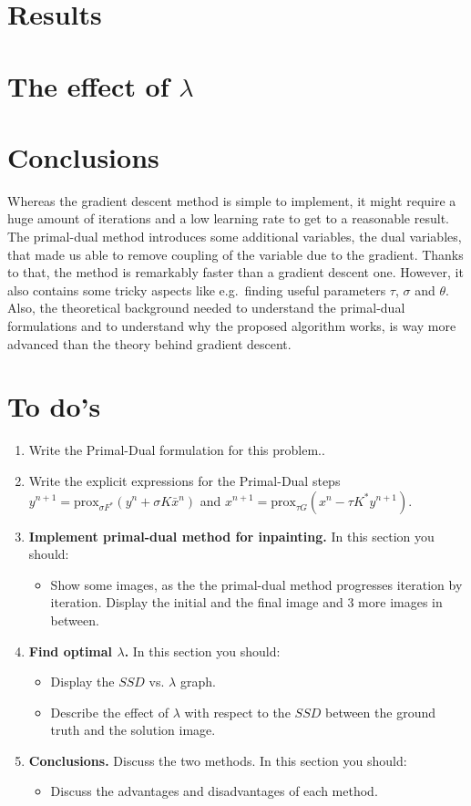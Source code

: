 \documentclass{paper}
\begin{document}
\section{Results}
\section{The effect of $\lambda$}
\section{Conclusions}
Whereas the gradient descent method is simple to implement, it might require a huge amount of iterations and a low learning rate to get to a reasonable result. 
The primal-dual method introduces some additional variables, the dual variables, that made us able to remove coupling of the variable due to the gradient. 
Thanks to that, the method is remarkably faster than a gradient descent one. 
However, it also contains some tricky aspects like e.g.\ finding useful parameters $\tau$, $\sigma$ and $\theta$. 
Also, the theoretical background needed to understand the primal-dual formulations and to understand why the proposed algorithm works, is way more advanced than the theory behind gradient descent.

\section{To do's}
\begin{enumerate}
\item Write the Primal-Dual formulation for this problem..

\item Write the explicit expressions for the Primal-Dual steps $y^{n+1} = \text{prox}_{\sigma F^*} (y^n + \sigma K \bar{x}^n)$ and $x^{n+1} = \text{prox}_{\tau G} (x^n  - \tau K^* y^{n+1})$.


\item \textbf{Implement primal-dual method for inpainting.} In this section you should:

\begin{itemize}
\item Show some images, as the the primal-dual method progresses iteration by iteration. Display the initial and the final image and 3 more images in between.
\end{itemize}
\item \textbf{ Find optimal $\lambda$.} In this section you should:

\begin{itemize}
\item Display the $SSD$ vs. $\lambda$ graph.
\item Describe the effect of $\lambda$ with respect to the $SSD$ between the ground truth and the solution image.
\end{itemize}

\item \textbf{ Conclusions.} Discuss the two methods. In this section you should:
\begin{itemize}
\item Discuss the advantages and disadvantages of each method.
\end{itemize}
\end{enumerate}


\nocite{*}


 
\end{document}
